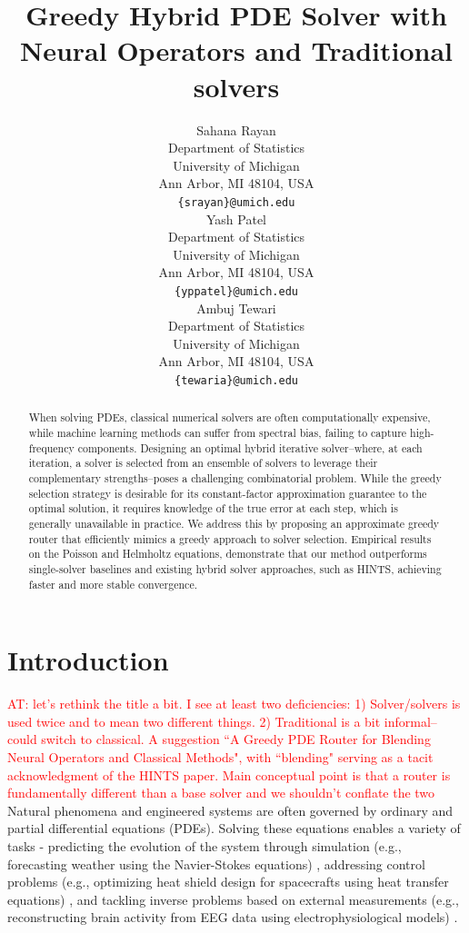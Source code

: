 \documentclass{article} %
\title{Greedy Hybrid PDE Solver with \\ Neural Operators and Traditional solvers}
\author{Sahana Rayan \\
Department of Statistics\\
University of Michigan\\
Ann Arbor, MI 48104, USA \\
\texttt{\{srayan\}@umich.edu} \\
\And
Yash Patel \\
Department of Statistics\\
University of Michigan\\
Ann Arbor, MI 48104, USA \\
\texttt{\{yppatel\}@umich.edu} \\
\And
Ambuj Tewari \\
Department of Statistics\\
University of Michigan\\
Ann Arbor, MI 48104, USA \\
\texttt{\{tewaria\}@umich.edu} \\
}
\newcommand\ambuj[1]{\textcolor{red}{AT: #1}}
\begin{document}
\maketitle

\begin{abstract}


When solving PDEs, classical numerical solvers are often computationally expensive, while machine learning methods can suffer from spectral bias, failing to capture high-frequency components. Designing an optimal hybrid iterative solver--where, at each iteration, a solver is selected from an ensemble of solvers to leverage their complementary strengths--poses a challenging combinatorial problem. While the greedy selection strategy is desirable for its constant-factor approximation guarantee to the optimal solution, it requires knowledge of the true error at each step, which is generally unavailable in practice. We address this by proposing an approximate greedy router that efficiently mimics a greedy approach to solver selection. Empirical results on the Poisson and Helmholtz equations, demonstrate that our method outperforms single-solver baselines and existing hybrid solver approaches, such as HINTS, achieving faster and more stable convergence.

\end{abstract}

\section{Introduction}

\ambuj{let's rethink the title a bit. I see at least two deficiencies: 1) Solver/solvers is used twice and to mean two different things. 2) Traditional is a bit informal--could switch to classical. A suggestion ``A Greedy PDE Router for Blending Neural Operators and Classical Methods", with ``blending" serving as a tacit acknowledgment of the HINTS paper. Main conceptual point is that a router is fundamentally different than a base solver and we shouldn't conflate the two}
Natural phenomena and engineered systems are often governed by ordinary and partial differential equations (PDEs). Solving these equations enables a variety of tasks - predicting the evolution of the system through simulation (e.g., forecasting weather using the Navier-Stokes equations) \citep{kalnay2003atmospheric,bauer2015quiet,staniforth1991semi}, addressing control problems (e.g., optimizing heat shield design for spacecrafts using heat transfer equations) \citep{anderson1989hypersonic,troltzsch2010optimal}, and tackling inverse problems based on external measurements (e.g., reconstructing brain activity from EEG data using electrophysiological models) \citep{baillet2001electromagnetic,grech2008review}. 
\end{document}
